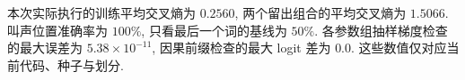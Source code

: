 本次实际执行的训练平均交叉熵为 $0.2560$, 两个留出组合的平均交叉熵为 $1.5066$. 叫声位置准确率为 $100\%$, 只看最后一个词的基线为 $50\%$. 各参数组抽样梯度检查的最大误差为 $5.38\times10^{-11}$, 因果前缀检查的最大 logit 差为 $0.0$. 这些数值仅对应当前代码、种子与划分.
